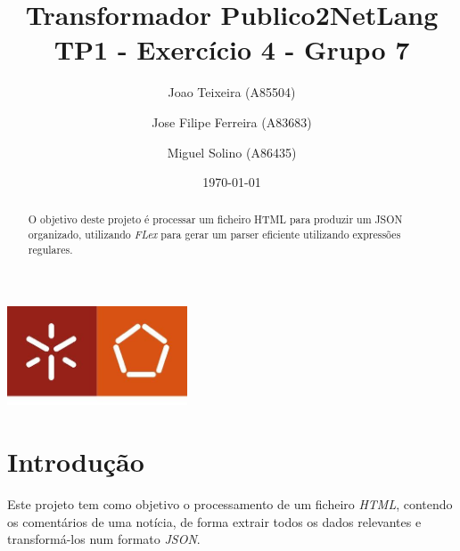 \documentclass[a4paper]{report}
\begin{document}
\title{Transformador Publico2NetLang \\
\large TP1 - Exercício 4 - Grupo 7}
\author{Joao Teixeira (A85504) \and Jose Filipe Ferreira (A83683) \and Miguel
Solino (A86435)}
\date{\today}

\begin{center}
    \begin{minipage}{0.75\linewidth}
        \centering
        \includegraphics[width=0.4\textwidth]{eng.jpeg}\par\vspace{1cm}
        \vspace{1.5cm}
        \href{https://www.uminho.pt/PT}
        {\color{black}{\scshape\LARGE Universidade do Minho}} \par
        \vspace{1cm}
        \href{https://www.di.uminho.pt/}
        {\color{black}{\scshape\Large Departamento de Informática}} \par
        \vspace{1.5cm}
        \maketitle
    \end{minipage}
\end{center}

\begin{abstract}
    \begin{center}
        O objetivo deste projeto é processar um ficheiro HTML para produzir um
        JSON organizado, utilizando \textit{FLex} para gerar um parser eficiente
        utilizando expressões regulares.
    \end{center}
\end{abstract}

\tableofcontents

\pagebreak

\chapter{Introdução}
Este projeto tem como objetivo o processamento de um ficheiro \textit{HTML},
contendo os comentários de uma notícia, de forma extrair todos os dados
relevantes e transformá-los num formato \textit{JSON}.
\end{document}
